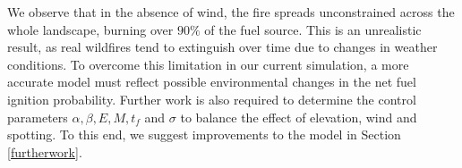 \indent We observe that in the absence of wind, the fire spreads unconstrained across the whole landscape, burning over $90\%$ of the fuel source. This is an unrealistic result, as real wildfires tend to extinguish over time due to changes in weather conditions. To overcome this limitation in our current simulation, a more accurate model must reflect possible environmental changes in the net fuel ignition probability. Further work is also required to determine the control parameters $\alpha,\beta,E,M,t_f$ and $\sigma$ to balance the effect of elevation, wind and spotting. To this end, we suggest improvements to the model in Section \ref{furtherwork}.